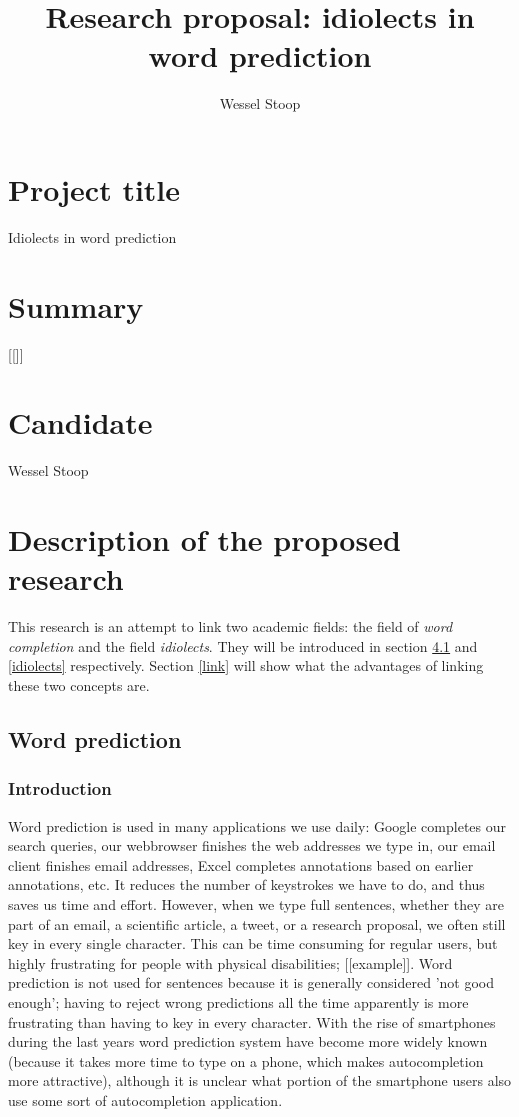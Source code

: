 \documentclass[12pt]{article}
\title{Research proposal: idiolects in word prediction}
\author{Wessel Stoop}
\begin{document}
\section{Project title}
Idiolects in word prediction

\section{Summary}
[[]]

\section{Candidate}
Wessel Stoop

\section{Description of the proposed research}

This research is an attempt to link two academic fields: the field of \emph{word completion} and the field \emph{idiolects}. They will be introduced in section \ref{wordprediction} and \ref{idiolects} respectively. Section \ref{link} will show what the advantages of linking these two concepts are.

\subsection{Word prediction} \label{wordprediction}

\subsubsection{Introduction}

Word prediction is used in many applications we use daily: Google completes our search queries, our webbrowser finishes the web addresses we type in, our email client finishes email addresses, Excel completes annotations based on earlier annotations, etc. It reduces the number of keystrokes we have to do, and thus saves us time and effort. However, when we type full sentences, whether they are part of an email, a scientific article, a tweet, or a research proposal, we often still key in every single character. This can be time consuming for regular users, but highly frustrating for people with physical disabilities; [[example]]. Word prediction is not used for sentences because it is generally considered 'not good enough'; having to reject wrong predictions all the time apparently is more frustrating than having to key in every character. With the rise of smartphones during the last years word prediction system have become more widely known (because it takes more time to type on a phone, which makes autocompletion more attractive), although it is unclear what portion of the smartphone users also use some sort of autocompletion application.
\end{document}
